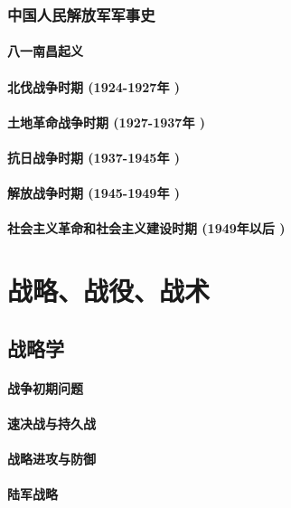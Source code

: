 \documentclass[UTF8]{../ApplicationUniverse}
\begin{document}
    \subsection{中国人民解放军军事史}
        \subsubsection{八一南昌起义}
        \subsubsection{北伐战争时期 (1924-1927年 )}
        \subsubsection{土地革命战争时期 (1927-1937年 )}
        \subsubsection{抗日战争时期 (1937-1945年 )}
        \subsubsection{解放战争时期 (1945-1949年 )}
        \subsubsection{社会主义革命和社会主义建设时期 (1949年以后 )}






\chapter{战略、战役、战术}
\section{战略学}
        \subsubsection{战争初期问题}
        \subsubsection{速决战与持久战}
        \subsubsection{战略进攻与防御}
        \subsubsection{陆军战略}
\end{document}
